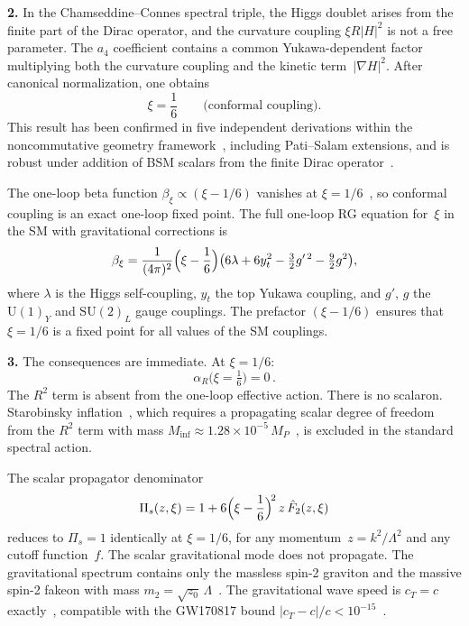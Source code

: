 \documentclass[12pt]{article}
\begin{document}
\medskip

\noindent\textbf{2.}
In the Chamseddine--Connes spectral triple, the Higgs doublet
arises from the finite part of the Dirac operator, and the
curvature coupling $\xi R|H|^2$ is not a free parameter.  The
$a_4$ coefficient contains a common Yukawa-dependent factor
multiplying both the curvature coupling and the kinetic
term~$|\nabla H|^2$.  After canonical normalization, one
obtains~\cite{CCM:2006,CC:2010,CCS:2013,vS:2015,DLM:2014}
\begin{equation}\label{eq:xi}
  \xi = \frac{1}{6}\qquad\text{(conformal coupling)}.
\end{equation}
This result has been confirmed in five independent derivations
within the noncommutative geometry
framework~\cite{CCM:2006,CC:2010,CCS:2013,vS:2015,DLM:2014},
including Pati--Salam extensions, and is robust under
addition of BSM scalars from the finite Dirac
operator~\cite{BFS:2010,CCS:2013ps,vdD:2018}.

The one-loop beta function $\beta_\xi \propto (\xi - 1/6)$
vanishes at $\xi = 1/6$~\cite{ParkerToms:2009}, so conformal
coupling is an exact one-loop fixed point.  The full one-loop
RG equation for~$\xi$ in the SM with gravitational corrections
is~\cite{ParkerToms:2009,Buchbinder:1992}
\begin{equation}\label{eq:betaxi}
  \beta_\xi = \frac{1}{(4\pi)^2}\Bigl(\xi - \frac{1}{6}\Bigr)
  \bigl(6\lambda + 6y_t^2 - \tfrac{3}{2}g'^{\,2}
  - \tfrac{9}{2}g^2\bigr),
\end{equation}
where $\lambda$ is the Higgs self-coupling, $y_t$ the top
Yukawa coupling, and $g'$, $g$ the $\mathrm{U}(1)_Y$ and
$\mathrm{SU}(2)_L$ gauge couplings.  The prefactor
$(\xi - 1/6)$ ensures that $\xi = 1/6$ is a fixed point
for all values of the SM couplings.

\medskip

\noindent\textbf{3.}
The consequences are immediate.  At $\xi = 1/6$:
\begin{equation}\label{eq:alphaR-zero}
  \alpha_R\bigl(\xi = \tfrac{1}{6}\bigr) = 0\,.
\end{equation}
The $R^2$ term is absent from the one-loop effective action.
There is no scalaron.  Starobinsky inflation~\cite{Starobinsky:1980},
which requires a propagating scalar degree of freedom from the
$R^2$ term with mass $M_{\mathrm{inf}} \approx 1.28 \times
10^{-5}\,M_P$~\cite{Planck:2018}, is excluded in the standard
spectral action.

The scalar propagator denominator
\begin{equation}\label{eq:Pis}
  \Pi_s(z, \xi) = 1 + 6\Bigl(\xi - \frac{1}{6}\Bigr)^{\!2}\,z\,
  \hat{F}_2(z, \xi)
\end{equation}
reduces to $\Pi_s = 1$ identically at $\xi = 1/6$, for any
momentum~$z = k^2/\Lambda^2$ and any cutoff function~$f$.
The scalar gravitational mode does not propagate.  The
gravitational spectrum contains only the massless spin-2
graviton and the massive spin-2 fakeon with mass
$m_2 = \sqrt{z_0}\,\Lambda$~\cite{Alfyorov:2026paper1}.
The gravitational wave speed is $c_T = c$
exactly~\cite{Alfyorov:2026paper4}, compatible with the
GW170817 bound $|c_T - c|/c < 10^{-15}$~\cite{GW170817:2017}.
\end{document}
